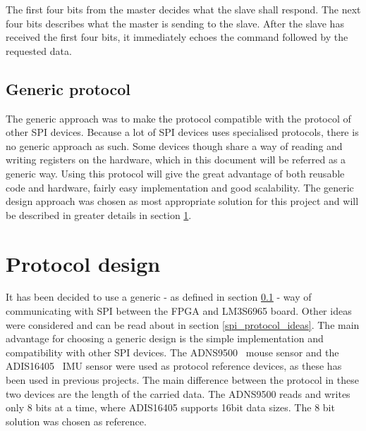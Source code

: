 The first four bits from the master decides what the slave shall respond. The next four bits describes what the master is sending to the slave. After the slave has received the first four bits, it immediately echoes the command followed by the requested data.

\subsection{Generic protocol}
\label{spi_generic_protocol}
The generic approach was to make the protocol compatible with the protocol of other SPI devices. Because a lot of SPI devices uses specialised protocols, there is no generic approach as such. Some devices though share a way of reading and writing registers on the hardware, which in this document will be referred as a generic way. Using this protocol will give the great advantage of both reusable code and hardware, fairly easy implementation and good scalability. The generic design approach was chosen as most appropriate solution for this project and will be described in greater details in section \ref{spi_rotocol_design}.





\section{Protocol design}
\label{spi_rotocol_design}
It has been decided to use a generic - as defined in section \ref{spi_generic_protocol} - way of communicating with SPI between the FPGA and LM3S6965 board. Other ideas were considered and can be read about in section \ref{spi_protocol_ideas}.
The main advantage for choosing a generic design is the simple implementation and compatibility with other SPI devices. The ADNS9500~\cite{SPI_ADNS} mouse sensor and the ADIS16405~\cite{SPI_ADIS} IMU sensor were used as protocol reference devices, as these has been used in previous projects. The main difference between the protocol in these two devices are the length of the carried data. The ADNS9500 reads and writes only 8 bits at a time, where ADIS16405 supports 16bit data sizes. The 8 bit solution was chosen as reference.

